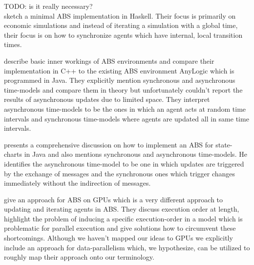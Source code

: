 TODO: \cite{polhill_what_2006} is it really necessary?\\
	
\cite{botta_time_2010} sketch a minimal ABS implementation in Haskell. Their focus is primarily on economic simulations and instead of iterating a simulation with a global time, their focus is on how to synchronize agents which have internal, local transition times. 

\cite{dawson_opening_2014} describe basic inner workings of ABS environments and compare their implementation in C++ to the existing ABS environment AnyLogic which is programmed in Java. They explicitly mention synchronous and asynchronous time-models and compare them in theory but unfortunately couldn't report the results of asynchronous updates due to limited space. They interpret asynchronous time-models to be the ones in which an agent acts at random time intervals and synchronous time-models where agents are updated all in same time intervals.

\cite{yuxuan_agent-based_2016} presents a comprehensive discussion on how to implement an ABS for state-charts in Java and also mentions synchronous and asynchronous time-models. He identifies the asynchronous time-model to be one in which updates are triggered by the exchange of messages and the synchronous ones which trigger changes immediately without the indirection of messages.

\cite{lysenko_framework_2008} give an approach for ABS on GPUs which is a very different approach to updating and iterating agents in ABS. They discuss execution order at length, highlight the problem of inducing a specific execution-order in a model which is problematic for parallel execution and give solutions how to circumvent these shortcomings. Although we haven't mapped our ideas to GPUs we explicitly include an approach for data-parallelism which, we hypothesize, can be utilized to roughly map their approach onto our terminology. 
